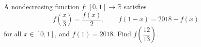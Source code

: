 A nondecreasing function $f:[0,1]\to\mathbb R$ satisfies
\[f\left(\dfrac{x}{3}\right)=\dfrac{f(x)}{2},\qquad f(1-x)=2018-f(x)\]
for all $x\in[0,1]$, and $f(1)=2018$. Find $f(\dfrac{12}{13})$.

